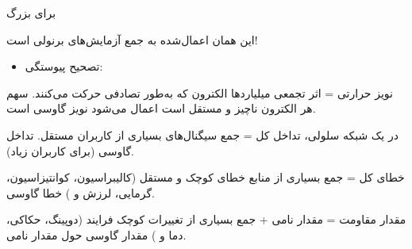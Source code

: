 
 برای  بزرگ

این همان  اعمال‌شده به جمع آزمایش‌های برنولی است!

\begin{itemize}
\tightlist
\item
  تصحیح پیوستگی: 
\end{itemize}



نویز حرارتی = اثر تجمعی میلیاردها الکترون که به‌طور تصادفی حرکت می‌کنند. سهم هر الکترون ناچیز و مستقل است  اعمال می‌شود \lr{\mbox{\ensuremath{\to}}} نویز گاوسی است.


در یک شبکه سلولی، تداخل کل = جمع سیگنال‌های بسیاری از کاربران مستقل.  تداخل \lr{\mbox{\ensuremath{\approx}}} گاوسی (برای کاربران زیاد).


خطای کل = جمع بسیاری از منابع خطای کوچک و مستقل (کالیبراسیون، کوانتیزاسیون، گرمایی، لرزش و )  خطا \lr{\mbox{\ensuremath{\approx}}} گاوسی.


مقدار مقاومت = مقدار نامی + جمع بسیاری از تغییرات کوچک فرایند (دوپینگ، حکاکی، دما و )  مقدار \lr{\mbox{\ensuremath{\approx}}} گاوسی حول مقدار نامی.


